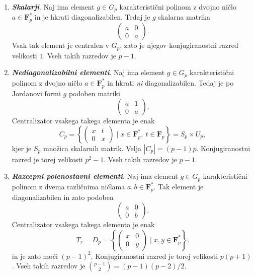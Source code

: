 \documentclass[11pt]{book}
\def\FF{\mathbf{F}}
\def\definicija{\color{rdeca}\bf\em}
\theoremstyle{definition}
\theoremstyle{zgled}
\theoremstyle{odprtproblem}
\theoremstyle{domacanaloga}
\theoremstyle{izrek}
\begin{document}
\begin{enumerate}
    \item {\definicija Skalarji}. Naj ima element $g \in G_p$ karakteristični polinom z dvojno ničlo $a \in \FF_p^*$ in je hkrati diagonalizabilen. Tedaj je $g$ skalarna matrika
    \[
        \begin{pmatrix}
            a & 0 \\ 0 & a
        \end{pmatrix}.
    \]
    Vsak tak element je centralen v $G_p$, zato je njegov konjugiranostni razred velikosti $1$. Vseh takih razredov je $p-1$.

    \item {\definicija Nediagonalizabilni elementi}. Naj ima element $g \in G_p$ karakteristični polinom z dvojno ničlo $a \in \FF_p^*$ in hkrati \emph{ni} diagonalizabilen. Tedaj je po Jordanovi formi $g$ podoben matriki
    \[
        \begin{pmatrix}
            a & 1 \\ 0 & a
        \end{pmatrix}. 
    \]
    Centralizator vsakega takega elementa je enak
    \[
      C_p = \left\{ \begin{pmatrix}
      x & t \\ 0 & x
  \end{pmatrix} \mid x \in \FF_p^*, \ t \in \FF_p \right\} = S_p \times U_p,
    \]
    kjer je $S_p$ množica skalarnih matrik. Velja $|C_p| = (p-1)p$. Konjugiranostni razred je torej velikosti $p^2 - 1$. Vseh takih razredov je $p-1$.

    \item {\definicija Razcepni polenostavni elementi}. Naj ima element $g \in G_p$ karakteristični polinom z dvema različnima ničlama $a,b \in \FF_p^*$. Tak element je diagonalizabilen in zato podoben
    \[
        \begin{pmatrix}
            a & 0 \\ 0 & b
        \end{pmatrix}.
    \]
    Centralizator vsakega takega elementa je enak
    \[
        T_r = D_p = \left\{ \begin{pmatrix}
            x & 0 \\ 0 & y
        \end{pmatrix} \mid x, y \in \FF_p^* \right\}.
    \]
    in je zato moči $(p-1)^2$. Konjugiranostni razred je torej velikosti $p(p+1)$. Vseh takih razredov je $\binom{p-1}{2} = (p-1)(p-2)/2$.


\end{enumerate}
\end{document}

